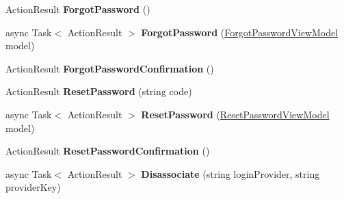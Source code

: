 \begin{DoxyCompactItemize}
\item 
Action\+Result {\bfseries Forgot\+Password} ()\hypertarget{class_p_c_builder_m_v_c_1_1_controllers_1_1_account_controller_a9123201fc1ab48128f5218abb3d859e0}{}\label{class_p_c_builder_m_v_c_1_1_controllers_1_1_account_controller_a9123201fc1ab48128f5218abb3d859e0}

\item 
async Task$<$ Action\+Result $>$ {\bfseries Forgot\+Password} (\hyperlink{class_p_c_builder_m_v_c_1_1_models_1_1_forgot_password_view_model}{Forgot\+Password\+View\+Model} model)\hypertarget{class_p_c_builder_m_v_c_1_1_controllers_1_1_account_controller_ad2776ab9d0b98fe8256c12d86037ddb2}{}\label{class_p_c_builder_m_v_c_1_1_controllers_1_1_account_controller_ad2776ab9d0b98fe8256c12d86037ddb2}

\item 
Action\+Result {\bfseries Forgot\+Password\+Confirmation} ()\hypertarget{class_p_c_builder_m_v_c_1_1_controllers_1_1_account_controller_a75d016c3002e245b36c3530a92d8afad}{}\label{class_p_c_builder_m_v_c_1_1_controllers_1_1_account_controller_a75d016c3002e245b36c3530a92d8afad}

\item 
Action\+Result {\bfseries Reset\+Password} (string code)\hypertarget{class_p_c_builder_m_v_c_1_1_controllers_1_1_account_controller_a8cf1eea1c767332f70226c31874e1321}{}\label{class_p_c_builder_m_v_c_1_1_controllers_1_1_account_controller_a8cf1eea1c767332f70226c31874e1321}

\item 
async Task$<$ Action\+Result $>$ {\bfseries Reset\+Password} (\hyperlink{class_p_c_builder_m_v_c_1_1_models_1_1_reset_password_view_model}{Reset\+Password\+View\+Model} model)\hypertarget{class_p_c_builder_m_v_c_1_1_controllers_1_1_account_controller_a785e97b23ad2b5effd37c12719597b03}{}\label{class_p_c_builder_m_v_c_1_1_controllers_1_1_account_controller_a785e97b23ad2b5effd37c12719597b03}

\item 
Action\+Result {\bfseries Reset\+Password\+Confirmation} ()\hypertarget{class_p_c_builder_m_v_c_1_1_controllers_1_1_account_controller_a74560e996a058eeda093d161a141c916}{}\label{class_p_c_builder_m_v_c_1_1_controllers_1_1_account_controller_a74560e996a058eeda093d161a141c916}

\item 
async Task$<$ Action\+Result $>$ {\bfseries Disassociate} (string login\+Provider, string provider\+Key)\hypertarget{class_p_c_builder_m_v_c_1_1_controllers_1_1_account_controller_a951282fe09539493acc5e0ac701125c5}{}\label{class_p_c_builder_m_v_c_1_1_controllers_1_1_account_controller_a951282fe09539493acc5e0ac701125c5}


\end{DoxyCompactItemize}
